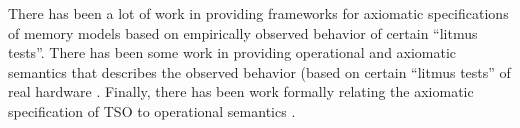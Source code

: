
There has been a lot of work in providing frameworks for axiomatic
specifications of memory models based on empirically observed behavior of
certain ``litmus
tests''\cite{Alglave11,Alglave:FMSD,alglave2012formal,Alglave:2010,Alglave:TACAS,alglave2014herding}.
There has been some work in providing operational and axiomatic semantics that
describes the observed behavior (based on certain ``litmus tests'' of real
hardware
\cite{mador2012axiomatic,sarkar2011understanding,sarkar2012synchronising}.
Finally, there has been work formally relating the axiomatic specification of
TSO to operational semantics \cite{x86tsocacm10}.


%



